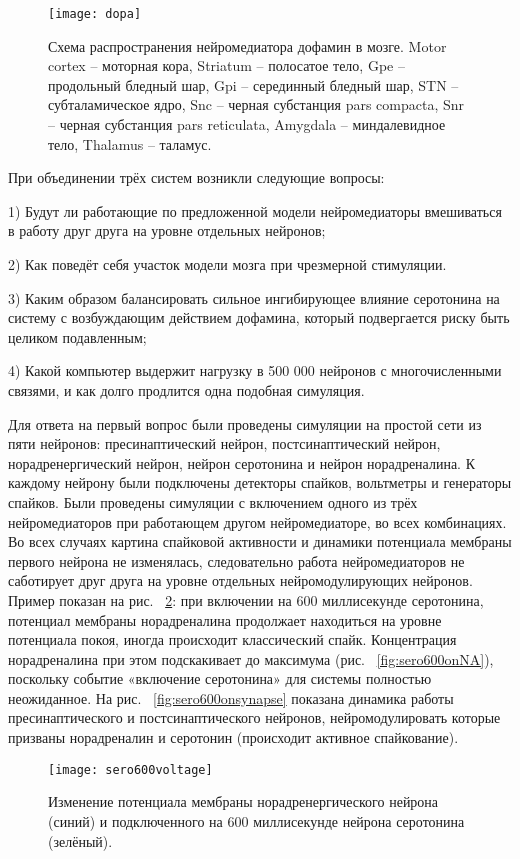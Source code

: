 \begin{figure}
	\centering
	\texttt{[image: dopa]}
	\caption{Схема распространения нейромедиатора дофамин в мозге. Motor cortex – моторная кора, Striatum – полосатое тело, Gpe -- продольный бледный шар, Gpi – серединный бледный шар, STN – субталамическое ядро, Snc -- черная субстанция pars compacta, Snr – черная субстанция pars reticulata, Amygdala – миндалевидное тело, Thalamus – таламус.}
	\label{fig:dopa_scheme}
\end{figure}

При объединении трёх систем возникли следующие вопросы:


1) Будут ли работающие по предложенной модели нейромедиаторы вмешиваться в работу друг друга на уровне отдельных нейронов;


2) Как поведёт себя участок модели мозга при чрезмерной стимуляции.


3) Каким образом балансировать сильное ингибирующее влияние серотонина на систему с возбуждающим действием дофамина, который подвергается риску быть целиком подавленным;


4) Какой компьютер выдержит нагрузку в 500 000 нейронов с многочисленными связями, и как долго продлится одна подобная симуляция.


Для ответа на первый вопрос были проведены симуляции на простой сети из пяти нейронов: пресинаптический нейрон, постсинаптический нейрон, норадренергический нейрон, нейрон серотонина и нейрон норадреналина. К каждому нейрону были подключены детекторы спайков, вольтметры и генераторы спайков. Были проведены симуляции с включением одного из трёх нейромедиаторов при работающем другом нейромедиаторе, во всех комбинациях. Во всех случаях картина спайковой активности и динамики потенциала мембраны первого нейрона не изменялась, следовательно работа нейромедиаторов не саботирует друг друга на уровне отдельных нейромодулирующих нейронов. Пример показан на рис. ~\ref{fig:sero600voltage}: при включении на 600 миллисекунде серотонина, потенциал мембраны норадреналина продолжает находиться на уровне потенциала покоя, иногда происходит классический спайк. Концентрация норадреналина при этом подскакивает до максимума (рис. ~\ref{fig:sero600onNA}), поскольку событие «включение серотонина» для системы полностью неожиданное. На рис. ~\ref{fig:sero600onsynapse} показана динамика работы пресинаптического и постсинаптического нейронов, нейромодулировать которые призваны норадреналин и серотонин (происходит активное спайкование).

\begin{figure}
	\centering
	\texttt{[image: sero600voltage]}
	\caption{Изменение потенциала мембраны норадренергического нейрона (синий) и подключенного на 600 миллисекунде нейрона серотонина (зелёный).}
	\label{fig:sero600voltage}
\end{figure}


